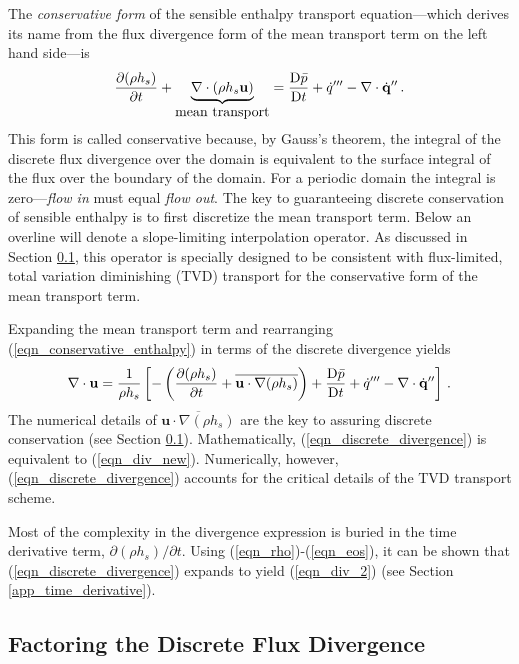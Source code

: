 The \emph{conservative form} of the sensible enthalpy transport equation---which derives its name from the flux divergence form of the mean transport term on the left hand side---is
\begin{equation}
\label{eqn_conservative_enthalpy}
\frac{\partial (\rho h_s)}{\partial t} + \underbrace{\nabla\cdot(\rho h_s \mathbf{u})}_{\mbox{mean transport}} = \frac{\mbox{D} \bar{p}}{\mbox{D} t} + \dot{q}^{\prime\prime\prime} - \nabla\cdot \dot{\mathbf{q}}^{\prime\prime} \,\mbox{.}
\end{equation}
This form is called conservative because, by Gauss's theorem, the integral of the discrete flux divergence over the domain is equivalent to the surface integral of the flux over the boundary of the domain.  For a periodic domain the integral is zero---\emph{flow in} must equal \emph{flow out}. The key to guaranteeing discrete conservation of sensible enthalpy is to first discretize the mean transport term.  Below an overline will denote a slope-limiting interpolation operator.  As discussed in Section \ref{app_transport_decomposition}, this operator is specially designed to be consistent with flux-limited, total variation diminishing (TVD) transport for the conservative form of the mean transport term.

Expanding the mean transport term and rearranging (\ref{eqn_conservative_enthalpy}) in terms of the discrete divergence yields
\begin{equation}
\label{eqn_discrete_divergence}
\nabla\cdot \mathbf{u} = \frac{1}{\rho h_s}\left[ -\left( \frac{\partial (\rho h_s)}{\partial t} + \overline{\mathbf{u}\cdot\nabla(\rho h_s)} \right) + \frac{\mbox{D} \bar{p}}{\mbox{D} t} + \dot{q}^{\prime\prime\prime} - \nabla\cdot \dot{\mathbf{q}}^{\prime\prime} \right] \,\mbox{.}
\end{equation}
The numerical details of $\overline{\mathbf{u}\cdot\nabla(\rho h_s)}$ are the key to assuring discrete conservation (see Section \ref{app_transport_decomposition}). Mathematically, (\ref{eqn_discrete_divergence}) is  equivalent to (\ref{eqn_div_new}). Numerically, however, (\ref{eqn_discrete_divergence}) accounts for the critical details of the TVD transport scheme.

Most of the complexity in the divergence expression is buried in the time derivative term, $\partial (\rho h_s)/\partial t$.  Using (\ref{eqn_rho})-(\ref{eqn_eos}), it can be shown that (\ref{eqn_discrete_divergence}) expands to yield (\ref{eqn_div_2}) (see Section \ref{app_time_derivative}).


\subsection{Factoring the Discrete Flux Divergence}
\label{app_transport_decomposition}

